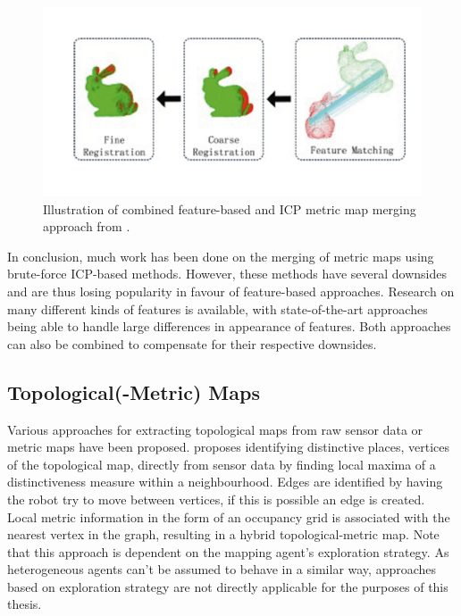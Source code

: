 \begin{figure}
    \centering
    \includegraphics*[width=\textwidth]{./fig/feature_matching.png}
    \caption{Illustration of combined feature-based and ICP metric map merging approach from \citet{yang_fast_2016}.}
    \label{fig:feature}
\end{figure}

In conclusion, much work has been done on the merging of metric maps using brute-force ICP-based methods. However, these methods have several downsides and are thus losing popularity in favour of feature-based approaches. Research on many different kinds of features is available, with state-of-the-art approaches being able to handle large differences in appearance of features. Both approaches can also be combined to compensate for their respective downsides.
                        
\subsection{Topological(-Metric) Maps}
Various approaches for extracting topological maps from raw sensor data or metric maps have been proposed. \citet{kuipers_robot_1991} proposes identifying distinctive places, vertices of the topological map, directly from sensor data by finding local maxima of a distinctiveness measure within a neighbourhood. Edges are identified by having the robot try to move between vertices, if this is possible an edge is created. Local metric information in the form of an occupancy grid is associated with the nearest vertex in the graph, resulting in a hybrid topological-metric map. Note that this approach is dependent on the mapping agent's exploration strategy. As heterogeneous agents can't be assumed to behave in a similar way, approaches based on exploration strategy are not directly applicable for the purposes of this thesis. 

